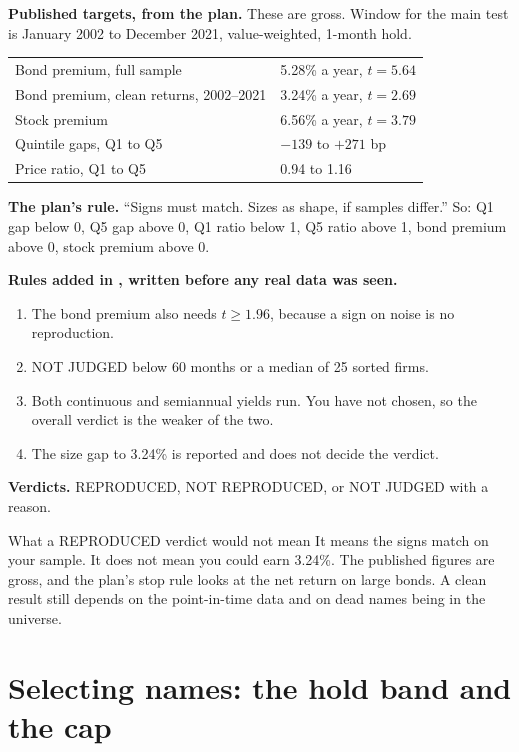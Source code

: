 \documentclass[11pt]{article}
\newcommand{\fn}[1]{\texttt{\detokenize{#1}}}
\begin{document}
\begin{techbox}
\textbf{Published targets, from the plan.} These are gross. Window for the main test is January 2002 to December 2021, value-weighted, 1-month hold.
\begin{center}\small
\begin{tabular}{@{}ll@{}}\toprule
Bond premium, full sample & 5.28\% a year, $t=5.64$\\
Bond premium, clean returns, 2002--2021 & 3.24\% a year, $t=2.69$\\
Stock premium & 6.56\% a year, $t=3.79$\\
Quintile gaps, Q1 to Q5 & $-139$ to $+271$ bp\\
Price ratio, Q1 to Q5 & 0.94 to 1.16\\\bottomrule
\end{tabular}
\end{center}
\textbf{The plan's rule.} ``Signs must match. Sizes as shape, if samples differ.'' So: Q1 gap below 0, Q5 gap above 0, Q1 ratio below 1, Q5 ratio above 1, bond premium above 0, stock premium above 0.

\textbf{Rules added in \fn{fk_f10.py}, written before any real data was seen.}
\begin{enumerate}[leftmargin=1.4em,nosep]
\item The bond premium also needs $t\ge 1.96$, because a sign on noise is no reproduction.
\item NOT JUDGED below 60 months or a median of 25 sorted firms.
\item Both continuous and semiannual yields run. You have not chosen, so the overall verdict is the weaker of the two.
\item The size gap to 3.24\% is reported and does not decide the verdict.
\end{enumerate}
\textbf{Verdicts.} REPRODUCED, NOT REPRODUCED, or NOT JUDGED with a reason.
\end{techbox}

\begin{warnbox}{What a REPRODUCED verdict would not mean}
It means the signs match on your sample. It does not mean you could earn 3.24\%. The published figures are gross, and the plan's stop rule looks at the net return on large bonds. A clean result still depends on the point-in-time data and on dead names being in the universe.
\end{warnbox}

\section{Selecting names: the hold band and the cap}\label{sec:select}
\end{document}
